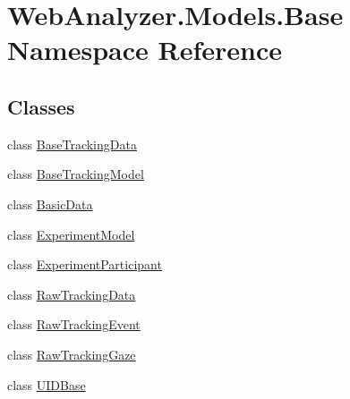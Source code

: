 \hypertarget{namespace_web_analyzer_1_1_models_1_1_base}{}\section{Web\+Analyzer.\+Models.\+Base Namespace Reference}
\label{namespace_web_analyzer_1_1_models_1_1_base}
\subsection*{Classes}
\begin{DoxyCompactItemize}
\item 
class \hyperlink{class_web_analyzer_1_1_models_1_1_base_1_1_base_tracking_data}{Base\+Tracking\+Data}
\item 
class \hyperlink{class_web_analyzer_1_1_models_1_1_base_1_1_base_tracking_model}{Base\+Tracking\+Model}
\item 
class \hyperlink{class_web_analyzer_1_1_models_1_1_base_1_1_basic_data}{Basic\+Data}
\item 
class \hyperlink{class_web_analyzer_1_1_models_1_1_base_1_1_experiment_model}{Experiment\+Model}
\item 
class \hyperlink{class_web_analyzer_1_1_models_1_1_base_1_1_experiment_participant}{Experiment\+Participant}
\item 
class \hyperlink{class_web_analyzer_1_1_models_1_1_base_1_1_raw_tracking_data}{Raw\+Tracking\+Data}
\item 
class \hyperlink{class_web_analyzer_1_1_models_1_1_base_1_1_raw_tracking_event}{Raw\+Tracking\+Event}
\item 
class \hyperlink{class_web_analyzer_1_1_models_1_1_base_1_1_raw_tracking_gaze}{Raw\+Tracking\+Gaze}
\item 
class \hyperlink{class_web_analyzer_1_1_models_1_1_base_1_1_u_i_d_base}{U\+I\+D\+Base}
\end{DoxyCompactItemize}
